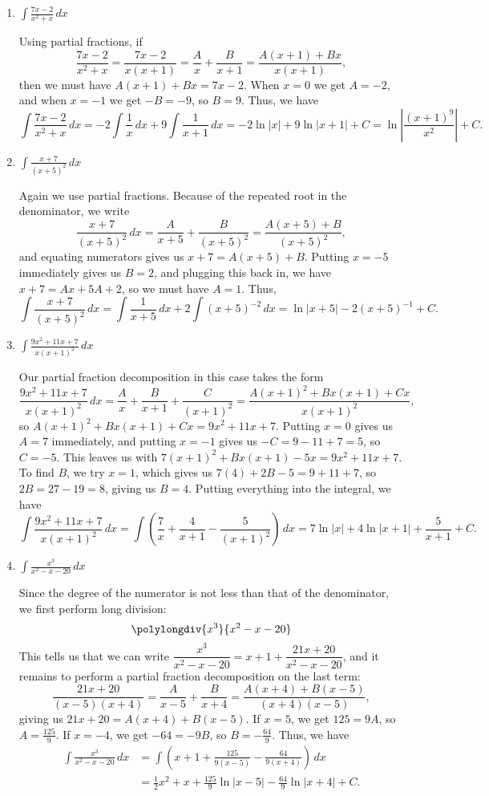 \documentclass[12pt]{article}
\newcommand{\di}{\displaystyle}
\newcommand{\abs}[1]{\lvert #1\rvert}
\begin{document}
\begin{enumerate}
 \item $\di \int \frac{7x-2}{x^2+x}\,dx$

Using partial fractions, if
\[
 \frac{7x-2}{x^2+x} = \frac{7x-2}{x(x+1)} = \frac{A}{x}+\frac{B}{x+1} = \frac{A(x+1)+Bx}{x(x+1)},
\]
then we must have $A(x+1)+Bx = 7x-2$. When $x=0$ we get $A=-2$, and when $x=-1$ we get $-B=-9$, so $B=9$. Thus, we have
\[
 \int\frac{7x-2}{x^2+x}\,dx = -2\int\frac{1}{x}\,dx + 9\int\frac{1}{x+1}\,dx = -2\ln\abs{x}+9\ln\abs{x+1}+C = \ln\left|\frac{(x+1)^9}{x^2}\right|+C.
\]

 
 \item $\di \int \frac{x+7}{(x+5)^2}\,dx$

Again we use partial fractions. Because of the repeated root in the denominator, we write
\[
 \frac{x+7}{(x+5)^2}\,dx = \frac{A}{x+5}+\frac{B}{(x+5)^2} = \frac{A(x+5)+B}{(x+5)^2},
\]
and equating numerators gives us $x+7 = A(x+5)+B$. Putting $x=-5$ immediately gives us $B=2$, and plugging this back in, we have $x+7 = Ax+5A+2$, so we must have $A=1$. Thus,
\[
 \int\frac{x+7}{(x+5)^2}\,dx = \int\frac{1}{x+5}\,dx+2\int(x+5)^{-2}\,dx = \ln\abs{x+5}-2(x+5)^{-1}+C.
\]


 \item $\di \int \frac{9x^2+11x+7}{x(x+1)^2}\,dx$

Our partial fraction decomposition in this case takes the form
\[
 \frac{9x^2+11x+7}{x(x+1)^2}\,dx = \frac{A}{x}+\frac{B}{x+1}+\frac{C}{(x+1)^2} = \frac{A(x+1)^2+Bx(x+1)+Cx}{x(x+1)^2},
\]
so $A(x+1)^2+Bx(x+1)+Cx = 9x^2+11x+7$. Putting $x=0$ gives us $A=7$ immediately, and putting $x=-1$ gives us $-C=9-11+7=5$, so $C=-5$. This leaves us with $7(x+1)^2+Bx(x+1)-5x=9x^2+11x+7$. To find $B$, we try $x=1$, which gives us $7(4)+2B-5=9+11+7$, so $2B = 27-19 = 8$, giving us $B=4$. Putting everything into the integral, we have
\[
 \int\frac{9x^2+11x+7}{x(x+1)^2}\,dx = \int\left(\frac{7}{x}+\frac{4}{x+1}-\frac{5}{(x+1)^2}\right)\,dx = 7\ln\abs{x}+4\ln\abs{x+1}+\frac{5}{x+1}+C.
\]


 \item $\di \int \frac{x^3}{x^2-x-20}\,dx$ 

Since the degree of the numerator is not less than that of the denominator, we first perform long division:
\[
 \polylongdiv{x^3}{x^2-x-20}
\]
This tells us that we can write $\dfrac{x^3}{x^2-x-20} = x+1 + \dfrac{21x+20}{x^2-x-20}$, and it remains to perform a partial fraction decomposition on the last term:
\[
 \frac{21x+20}{(x-5)(x+4)} = \frac{A}{x-5}+\frac{B}{x+4} = \frac{A(x+4)+B(x-5)}{(x+4)(x-5)}, 
\]
giving us $21x+20 = A(x+4)+B(x-5)$. If $x=5$, we get $125 = 9A$, so $A = \frac{125}{9}$. If $x=-4$, we get $-64 = -9B$, so $B = -\frac{64}{9}$. Thus, we have
\begin{align*}
 \int \frac{x^3}{x^2-x-20}\,dx & = \int\left(x+1 + \frac{125}{9(x-5)}-\frac{64}{9(x+4)}\right)\,dx\\
& = \frac{1}{2}x^2+x+\frac{125}{9}\ln\abs{x-5}-\frac{64}{9}\ln\abs{x+4}+C.
\end{align*}



\end{enumerate}
\end{document}
